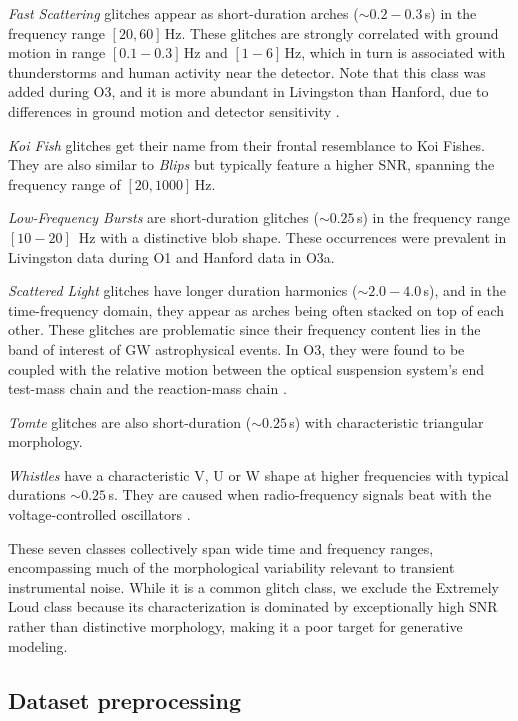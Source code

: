 \documentclass[reprint,nofootinbib,amsmath,amssymb,aps,floatfix]{revtex4-2}
\begin{document}
\textit{Fast Scattering} glitches appear as short-duration arches ($\sim 0.2 - 0.3\,$s) in the frequency range $[20, 60] \,$Hz. These glitches are strongly correlated with ground motion in range $[0.1 -0.3] \,$Hz and $[1-6] \,$Hz, which in turn is associated with thunderstorms and human activity near the detector. Note that this class was added during O3, and it is more abundant in Livingston than Hanford, due to differences in ground motion and detector sensitivity \cite{Soni:2021cjy}.

\textit{Koi Fish} glitches get their name from their frontal resemblance to Koi Fishes. They are also similar to \textit{Blips} but typically feature a higher SNR, spanning the frequency range of $[20, 1000] \,$Hz.

\textit{Low-Frequency Bursts} are short-duration  glitches ($\sim 0.25\,$s) in the frequency range $[10 - 20]\,$ Hz with a distinctive blob shape. These occurrences were prevalent in Livingston data during O1 and Hanford data in O3a.

\textit{Scattered Light} glitches have longer duration harmonics ($\sim2.0 - 4.0\,$s), and in the time-frequency domain, they appear as arches being often stacked on top of each other. These glitches are problematic since their frequency content lies in the band of interest of GW astrophysical events. In O3, they were found to be coupled with the relative motion between the optical suspension system’s end test-mass chain and the reaction-mass chain \cite{Soni:2021cjy}.

\textit{Tomte} glitches are also short-duration ($\sim 0.25\,$s) with characteristic triangular morphology.

\textit{Whistles} have a characteristic V, U or W shape at higher frequencies with typical durations $\sim 0.25\,$s. They are caused when radio-frequency signals beat with the voltage-controlled oscillators \cite{Nuttall:2015dqa}.

These seven classes collectively span wide time and frequency ranges, encompassing much of the morphological variability relevant to transient instrumental noise.
While it is a common glitch class, we exclude the Extremely Loud class because its characterization is dominated by exceptionally high SNR rather than distinctive morphology, making it a poor target for generative modeling.


\subsection{Dataset preprocessing}
\end{document}

